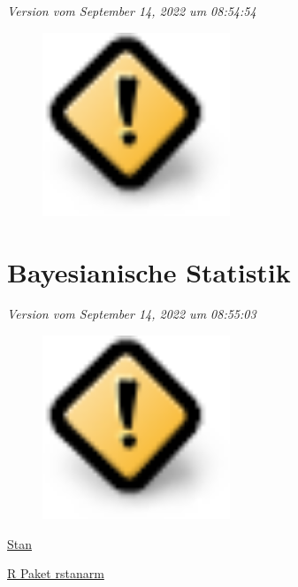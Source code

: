 \documentclass[
  letterpaper,
]{scrbook}
\begin{document}
\emph{Version vom September 14, 2022 um 08:54:54}

\begin{figure}

{\centering \includegraphics[width=0.5\textwidth,height=\textheight]{./images/caution.png}

}

\end{figure}

\part{Bayesianische Statistik}

\emph{Version vom September 14, 2022 um 08:55:03}

\begin{figure}

{\centering \includegraphics[width=0.5\textwidth,height=\textheight]{./images/caution.png}

}

\end{figure}

\href{https://mc-stan.org/}{Stan}

\href{https://mc-stan.org/rstanarm/articles/index.html}{R Paket
rstanarm}
\end{document}
